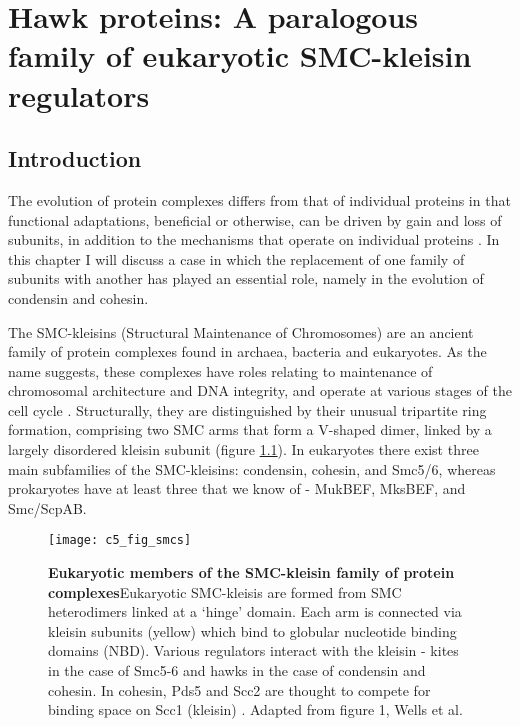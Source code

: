 \documentclass[a4paper,11pt,twoside,openright]{scrbook}
\begin{document}
\chapter{Hawk proteins: A paralogous family of eukaryotic SMC-kleisin regulators} \label{chapter:hawks}

\section{Introduction}
The evolution of protein complexes differs from that of individual proteins in that functional adaptations, beneficial or otherwise, can be driven by gain and loss of subunits, in addition to the mechanisms that operate on individual proteins \cite{Gabaldon2005,Huynen2013,Marsh2015}. In this chapter I will discuss a case in which the replacement of one family of subunits with another has played an essential role, namely in the evolution of condensin and cohesin.

The SMC-kleisins (Structural Maintenance of Chromosomes) are an ancient family of protein complexes found in archaea, bacteria and eukaryotes. As the name suggests, these complexes have roles relating to maintenance of chromosomal architecture and DNA integrity, and operate at various stages of the cell cycle \cite{Nasmyth2009, Hirano2016}. Structurally, they are distinguished by their unusual tripartite ring formation, comprising two SMC arms that form a V-shaped dimer, linked by a largely disordered kleisin subunit (figure \ref{figure:smcs}). In eukaryotes there exist three main subfamilies of the SMC-kleisins: condensin, cohesin, and Smc5/6, whereas prokaryotes have at least three that we know of - MukBEF, MksBEF, and Smc/ScpAB.

\begin{figure}[h]
\fcapsideright
    {\caption[Eukaryotic members of the SMC-kleisin family of protein complexes]{\sffamily\textbf{Eukaryotic members of the SMC-kleisin family of protein complexes}\newline \small Eukaryotic SMC-kleisis are formed from SMC heterodimers linked at a `hinge' domain. Each arm is connected via kleisin subunits (yellow) which bind to globular nucleotide binding domains (NBD). Various regulators interact with the kleisin - kites in the case of Smc5-6 and hawks in the case of condensin and cohesin. In cohesin, Pds5 and Scc2 are thought to compete for binding space on Scc1 (kleisin) \cite{Kikuchi2016}. Adapted from figure 1, Wells et al. \cite{Wells2017}}\label{figure:smcs}}
    {\texttt{[image: c5\_fig\_smcs]}}
\end{figure}
\end{document}
